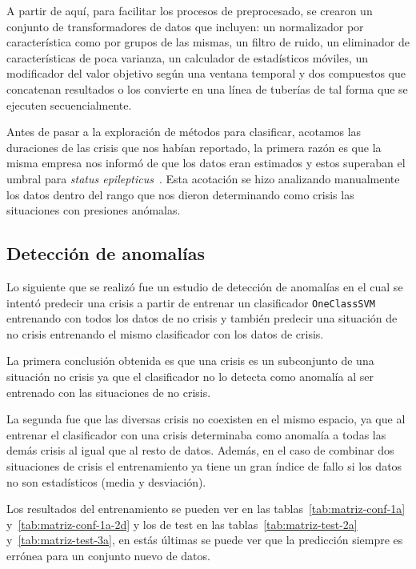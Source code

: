 A partir de aquí, para facilitar los procesos de preprocesado, se crearon un conjunto de transformadores de datos que incluyen: un normalizador por característica como por grupos de las mismas, un filtro de ruido, un eliminador de características de poca varianza, un calculador de estadísticos móviles, un modificador del valor objetivo según una ventana temporal y dos compuestos que concatenan resultados o los convierte en una línea de tuberías de tal forma que se ejecuten secuencialmente.

Antes de pasar a la exploración de métodos para clasificar, acotamos las duraciones de las crisis que nos habían reportado, la primera razón es que la misma empresa nos informó de que los datos eran estimados y estos superaban el umbral para \textit{status epilepticus}~\cite{epilepsia}. Esta acotación se hizo analizando manualmente los datos dentro del rango que nos dieron determinando como crisis las situaciones con presiones anómalas. 

\subsection{Detección de anomalías}
Lo siguiente que se realizó fue un estudio de detección de anomalías en el cual se intentó predecir una crisis a partir de entrenar un clasificador \texttt{OneClassSVM} entrenando con todos los datos de no crisis y también predecir una situación de no crisis entrenando el mismo clasificador con los datos de crisis.

La primera conclusión obtenida es que una crisis es un subconjunto de una situación no crisis ya que el clasificador no lo detecta como anomalía al ser entrenado con las situaciones de no crisis.

La segunda fue que las diversas crisis no coexisten en el mismo espacio, ya que al entrenar el clasificador con una crisis determinaba como anomalía a todas las demás crisis al igual que al resto de datos. Además, en el caso de combinar dos situaciones de crisis el entrenamiento ya tiene un gran índice de fallo si los datos no son estadísticos (media y desviación).

Los resultados del entrenamiento se pueden ver en las tablas~\ref{tab:matriz-conf-1a} y~\ref{tab:matriz-conf-1a-2d} y los de test en las tablas~\ref{tab:matriz-test-2a} y~\ref{tab:matriz-test-3a}, en estás últimas se puede ver que la predicción siempre es errónea para un conjunto nuevo de datos.



